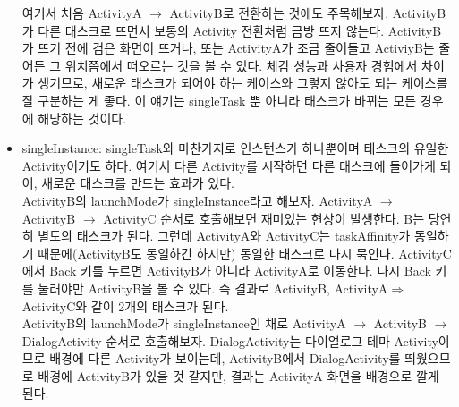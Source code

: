 \begin{itemize}
여기서 처음 ActivityA $\rightarrow$ ActivityB로 전환하는 것에도 주목해보자.
ActivityB가 다른 태스크로 뜨면서 보통의 Activity 전환처럼 금방 뜨지 않는다. 
ActivityB가 뜨기 전에 검은 화면이 뜨거나, 또는 ActivityA가 조금 줄어들고 ActiviyB는 줄어든 그 위치쯤에서 떠오르는 것을 볼 수 있다.
체감 성능과 사용자 경험에서 차이가 생기므로, 새로운 태스크가 되어야 하는 케이스와 그렇지 않아도 되는 케이스를 잘 구분하는 게 좋다.
이 얘기는 singleTask 뿐 아니라 태스크가 바뀌는 모든 경우에 해당하는 것이다.

\item singleInstance: singleTask와 마찬가지로 인스턴스가 하나뿐이며 태스크의 유일한 Activity이기도 하다. 
여기서 다른 Activity를 시작하면 다른 태스크에 들어가게 되어, 새로운 태스크를 만드는 효과가 있다.\\

ActivityB의 launchMode가 singleInstance라고 해보자. ActivityA $\rightarrow$ ActivityB $\rightarrow$ ActivityC 순서로 호출해보면 재미있는 현상이 발생한다. B는 당연히 별도의 태스크가 된다. 
그런데 ActivityA와 ActivityC는 taskAffinity가 동일하기 때문에(ActivityB도 동일하긴 하지만) 동일한 태스크로 다시 묶인다. 
ActivityC에서 Back 키를 누르면 ActivityB가 아니라 ActivityA로 이동한다. 다시 Back 키를 눌러야만 ActivityB을 볼 수 있다. 
즉 결과로 ActivityB, ActivityA$\Rightarrow$ActivityC와 같이 2개의 태스크가 된다.\\

ActivityB의 launchMode가 singleInstance인 채로 ActivityA $\rightarrow$ ActivityB $\rightarrow$ DialogActivity 순서로 호출해보자. 
DialogActivity는 다이얼로그 테마 Activity이므로 배경에 다른 Activity가 보이는데, ActivityB에서 DialogActivity를 띄웠으므로 배경에 ActivityB가 있을 것 같지만, 결과는 ActivityA 화면을 배경으로 깔게 된다.\\


\end{itemize}
